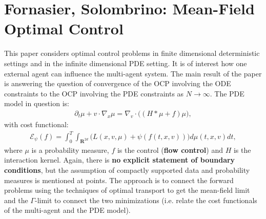 \documentclass[11pt, a4paper]{article}
\theoremstyle{definition}
\begin{document}
\section{Fornasier, Solombrino: Mean-Field Optimal Control \cite{Fornasier_2014}}
This paper considers optimal control problems in finite dimensional deterministic settings and in the infinite dimensional PDE setting. It is of interest how one external agent can influence the multi-agent system. The main result of the paper is answering the question of convergence of the OCP involving the ODE constraints to the OCP involving the PDE constraints as $N \to \infty$.
The PDE model in question is:
\begin{align*}
\partial_t \mu + v \cdot \nabla_x \mu = \nabla_v \cdot \bigg( (H \ast \mu + f)\mu\bigg),
\end{align*}
with cost functional:
\begin{align*}
\mathcal{E}_\psi(f) = \int_0^T \int_{\mathbf{R}^{2d}} \bigg( L(x,v,\mu) + \psi(f(t,x,v))  \bigg)d \mu(t,x,v) dt,
\end{align*}
where $\mu$ is a probability measure, $f$ is the control (\textbf{flow control}) and $H$ is the interaction kernel. Again, there is \textbf{no explicit statement of boundary conditions}, but the assumption of compactly supported data and probability measures is mentioned at points.
The approach is to connect the forward problems using the techniques of optimal transport to get the mean-field limit and the $\Gamma$-limit to connect the two minimizations (i.e. relate the cost functionals of the multi-agent and the PDE model).
\end{document}
